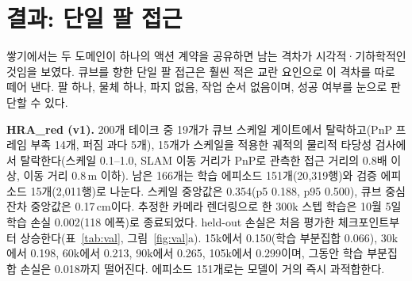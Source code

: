 \documentclass[conference,10pt]{IEEEtran}
\begin{document}
\section{결과: 단일 팔 접근}\label{sec:res3}
쌓기에서는 두 도메인이 하나의 액션 계약을 공유하면 남는 격차가 시각적·기하학적인 것임을 보였다. 큐브를 향한 단일 팔 접근은 훨씬 적은
교란 요인으로 이 격차를 따로 떼어 낸다. 팔 하나, 물체 하나, 파지 없음, 작업 순서 없음이며, 성공 여부를 눈으로 판단할 수 있다.

\textbf{HRA\_red (v1).} 200개 테이크 중 19개가 큐브 스케일 게이트에서 탈락하고(PnP 프레임 부족 14개, 퍼짐 과다 5개), 15개가 스케일을
적용한 궤적의 물리적 타당성 검사에서 탈락한다(스케일 0.1--1.0, SLAM 이동 거리가 PnP로 관측한 접근 거리의 0.8배 이상, 이동 거리
0.8\,m 이하). 남은 166개는 학습 에피소드 151개(20{,}319행)와 검증 에피소드 15개(2{,}011행)로 나눈다. 스케일 중앙값은 0.354(p5 0.188,
p95 0.500), 큐브 중심 잔차 중앙값은 0.17\,cm이다. 추정한 카메라 렌더링으로 한 300k 스텝 학습은 10월 5일 학습 손실 0.002(118 에폭)로
종료되었다. held-out 손실은 처음 평가한 체크포인트부터 상승한다(표~\ref{tab:val}, 그림~\ref{fig:val}a). 15k에서 0.150(학습 부분집합
0.066), 30k에서 0.198, 60k에서 0.213, 90k에서 0.265, 105k에서 0.299이며, 그동안 학습 부분집합 손실은 0.018까지 떨어진다. 에피소드
151개로는 모델이 거의 즉시 과적합한다.

\begin{table}[t]
\centering\footnotesize\setlength{\tabcolsep}{3pt}
\caption{체크포인트별 단일 팔 held-out 손실(지도되는 9차원에 대한 마스킹된 MSE). 괄호 안은 학습 부분집합 손실.}
\label{tab:val}
\end{table}
\end{document}
